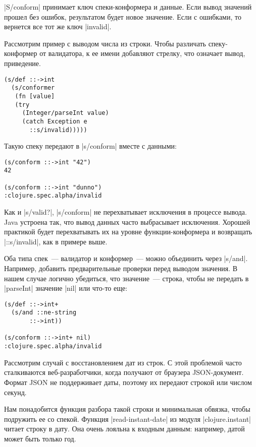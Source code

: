 \spverb|S/conform| принимает ключ спеки-конформера и данные. Если вывод значений прошел
без ошибок, результатом будет новое значение. Если с ошибками, то вернется все
тот же ключ \spverb|invalid|.

Рассмотрим пример с выводом числа из строки. Чтобы различать спеку-конформер от
валидатора, к ее имени добавляют стрелку, что означает вывод, приведение.

\begin{verbatim}
(s/def ::->int
  (s/conformer
   (fn [value]
   (try
     (Integer/parseInt value)
     (catch Exception e
       ::s/invalid)))))
\end{verbatim}

Такую спеку передают в \spverb|s/conform| вместе с данными:

\begin{verbatim}
(s/conform ::->int "42")
42

(s/conform ::->int "dunno")
:clojure.spec.alpha/invalid
\end{verbatim}

Как и \spverb|s/valid?|, \spverb|s/conform| не перехватывает исключения в процессе
вывода. Java устроена так, что вывод данных часто выбрасывает
исключения. Хорошей практикой будет перехватывать их на уровне
функции-конформера и возвращать \spverb|::s/invalid|, как в примере выше.

Оба типа спек~--- валидатор и конформер~--- можно объединить через
\spverb|s/and|. Например, добавить предварительные проверки перед выводом значения. В
нашем случае логично убедиться, что значение~--- строка, чтобы не передать в
\spverb|parseInt| значение \spverb|nil| или что-то еще:

\begin{verbatim}
(s/def ::->int+
  (s/and ::ne-string
       ::->int))

(s/conform ::->int+ nil)
:clojure.spec.alpha/invalid
\end{verbatim}

Рассмотрим случай с восстановлением дат из строк. С этой проблемой часто
сталкиваются веб-разработчики, когда получают от браузера JSON-документ. Формат
JSON не поддерживает даты, поэтому их передают строкой или числом секунд.

Нам понадобится функция разбора такой строки и минимальная обвязка, чтобы
подружить ее со спекой. Функция \spverb|read-instant-date| из модуля \spverb|clojure.instant|
читает строку в дату. Она очень лояльна к входным данным: например, датой может
быть только год.


